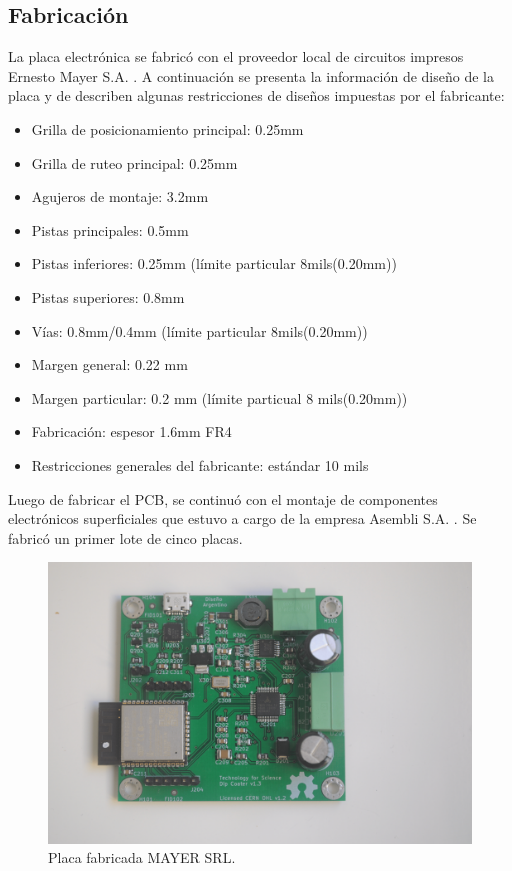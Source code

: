   
\subsection{Fabricación}
La placa electrónica se fabricó con el proveedor local de circuitos impresos Ernesto Mayer S.A. \citep{web_mayer}. A continuación se presenta la información de diseño de la placa y de describen algunas  restricciones de diseños impuestas por el fabricante:

\begin{itemize}

\item Grilla de posicionamiento principal: 0.25mm
\item Grilla de ruteo principal: 0.25mm
\item Agujeros de montaje: 3.2mm
\item Pistas principales: 0.5mm
\item Pistas inferiores: 0.25mm (límite particular 8mils(0.20mm))
\item Pistas superiores: 0.8mm
\item Vías: 0.8mm/0.4mm (límite particular 8mils(0.20mm))
\item Margen general: 0.22 mm
\item Margen particular: 0.2 mm (límite particual 8 mils(0.20mm))
\item Fabricación: espesor 1.6mm FR4  
\item Restricciones generales del fabricante: estándar 10 mils

\end{itemize}

Luego de fabricar el PCB, se continuó con el montaje de componentes electrónicos superficiales que estuvo a cargo de la empresa Asembli S.A. \citep{web_asembli}. Se fabricó un primer lote de cinco placas.


\begin{figure}[htbp]
	\centering
	\includegraphics[width=1\textwidth]{./Figures/dip_real_model.png}
	\caption{Placa fabricada MAYER SRL.}
	\label{fig:dip_real_model}
\end{figure}


